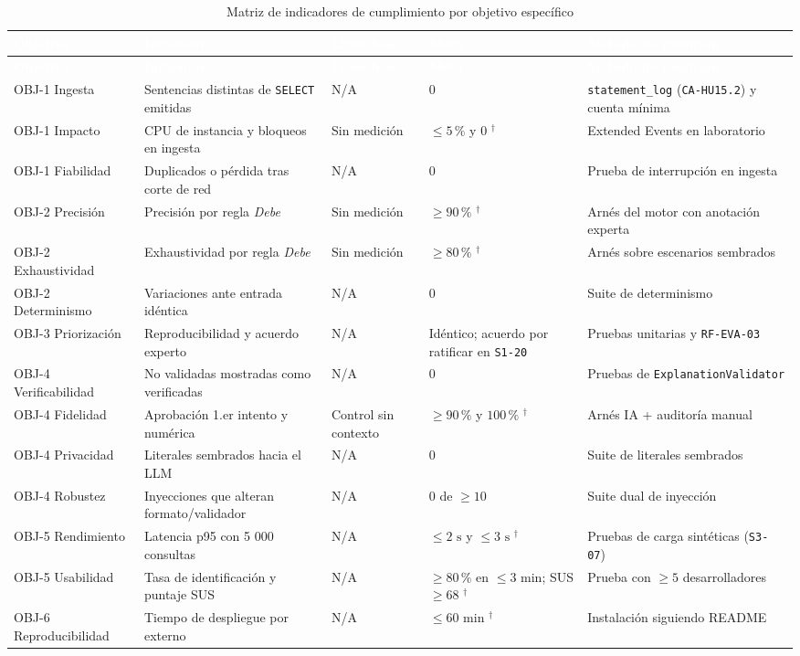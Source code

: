 \documentclass[12pt,a4paper]{article}
\newcommand{\dagsym}{\ensuremath{^{\dagger}}}
\begin{document}
\begingroup
{}
\scriptsize
\begin{longtable}{p{} p{} p{} p{} p{}}
\toprule
\rowcolor{utbblue}
\textcolor{white}{\textbf{Objetivo}} & \textcolor{white}{\textbf{Indicador}} & \textcolor{white}{\textbf{Línea base}} & \textcolor{white}{\textbf{Meta}} & \textcolor{white}{\textbf{Método de medición}} \\
\midrule
\endfirsthead
\toprule
\rowcolor{utbblue}
\textcolor{white}{\textbf{Objetivo}} & \textcolor{white}{\textbf{Indicador}} & \textcolor{white}{\textbf{Línea base}} & \textcolor{white}{\textbf{Meta}} & \textcolor{white}{\textbf{Método de medición}} \\
\midrule
\endhead
\bottomrule
\caption{Matriz de indicadores de cumplimiento por objetivo específico}
\label{tab:indicadores}
\endlastfoot
OBJ-1 Ingesta & Sentencias distintas de \texttt{SELECT} emitidas & N/A & 0 & \texttt{statement\_log} (\texttt{CA-HU15.2}) y cuenta mínima \\
OBJ-1 Impacto & CPU de instancia y bloqueos en ingesta & Sin medición & $\le 5\,\%$ y 0 \dagsym{} & Extended Events en laboratorio \\
OBJ-1 Fiabilidad & Duplicados o pérdida tras corte de red & N/A & 0 & Prueba de interrupción en ingesta \\
OBJ-2 Precisión & Precisión por regla \textit{Debe} & Sin medición & $\ge 90\,\%$ \dagsym{} & Arnés del motor con anotación experta \\
OBJ-2 Exhaustividad & Exhaustividad por regla \textit{Debe} & Sin medición & $\ge 80\,\%$ \dagsym{} & Arnés sobre escenarios sembrados \\
OBJ-2 Determinismo & Variaciones ante entrada idéntica & N/A & 0 & Suite de determinismo \\
OBJ-3 Priorización & Reproducibilidad y acuerdo experto & N/A & Idéntico; acuerdo por ratificar en \texttt{S1-20} & Pruebas unitarias y \texttt{RF-EVA-03} \\
OBJ-4 Verificabilidad & No validadas mostradas como verificadas & N/A & 0 & Pruebas de \texttt{ExplanationValidator} \\
OBJ-4 Fidelidad & Aprobación 1.er intento y numérica & Control sin contexto & $\ge 90\,\%$ y $100\,\%$ \dagsym{} & Arnés IA + auditoría manual \\
OBJ-4 Privacidad & Literales sembrados hacia el LLM & N/A & 0 & Suite de literales sembrados \\
OBJ-4 Robustez & Inyecciones que alteran formato/validador & N/A & 0 de $\ge 10$ & Suite dual de inyección \\
OBJ-5 Rendimiento & Latencia p95 con 5 000 consultas & N/A & $\le 2\text{ s}$ y $\le 3\text{ s}$ \dagsym{} & Pruebas de carga sintéticas (\texttt{S3-07}) \\
OBJ-5 Usabilidad & Tasa de identificación y puntaje SUS & N/A & $\ge 80\,\%$ en $\le 3\text{ min}$; SUS $\ge 68$ \dagsym{} & Prueba con $\ge 5$ desarrolladores \cite{nielsen-usability,brooke-sus} \\
OBJ-6 Reproducibilidad & Tiempo de despliegue por externo & N/A & $\le 60\text{ min}$ \dagsym{} & Instalación siguiendo README \\
\end{longtable}
\end{document}
